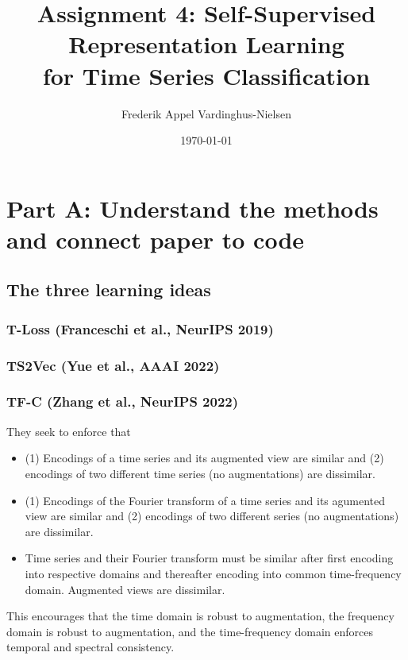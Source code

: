 \documentclass[a4paper,11pt]{article}
\title{Assignment 4: Self-Supervised Representation Learning\\ for Time Series Classification}
\author{Frederik Appel Vardinghus-Nielsen}
\date{\today}
\newcommand{\TODOfill}{\todo[inline]{Fill in.}}
\begin{document}
\maketitle
\listoftodos
\tableofcontents
\newpage

\section{Part A: Understand the methods and connect paper to code}

\subsection{The three learning ideas}

\subsubsection{T-Loss (Franceschi et al., NeurIPS 2019)}


\subsubsection{TS2Vec (Yue et al., AAAI 2022)}
\TODOfill

\subsubsection{TF-C (Zhang et al., NeurIPS 2022)}
They seek to enforce that
\begin{itemize}
\item[Time] (1) Encodings of a time series and its augmented view are similar and (2) encodings of two different time series (no augmentations) are dissimilar.
\item[Frqeuency] (1) Encodings of the Fourier transform of a time series and its agumented view are similar and (2) encodings of two different series (no augmentations) are dissimilar.
\item[Time-frequency] Time series and their Fourier transform must be similar after first encoding into respective domains and thereafter encoding into common time-frequency domain. Augmented views are dissimilar.
\end{itemize}
This encourages that the time domain is robust to augmentation, the frequency domain is robust to augmentation, and the time-frequency domain enforces temporal and spectral consistency.
\end{document}

